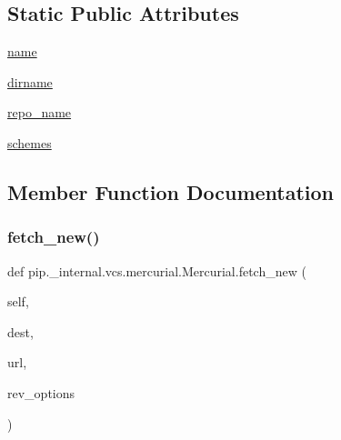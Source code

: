 \subsection*{Static Public Attributes}
\begin{DoxyCompactItemize}
\item 
\hyperlink{classpip_1_1__internal_1_1vcs_1_1mercurial_1_1Mercurial_ace7de8134914305d1206b35e1a99dc86}{name}
\item 
\hyperlink{classpip_1_1__internal_1_1vcs_1_1mercurial_1_1Mercurial_a1001ecd9ff559633d95e89dd4fe9453a}{dirname}
\item 
\hyperlink{classpip_1_1__internal_1_1vcs_1_1mercurial_1_1Mercurial_ab4679d727b3cc731db2797810e3afc35}{repo\+\_\+name}
\item 
\hyperlink{classpip_1_1__internal_1_1vcs_1_1mercurial_1_1Mercurial_a2f1bed2d44bdd78a5fb436e70aee81c4}{schemes}
\end{DoxyCompactItemize}


\subsection{Member Function Documentation}
\mbox{\label{classpip_1_1__internal_1_1vcs_1_1mercurial_1_1Mercurial_a7951bc33f0d4f7a510d41c5239c88cdf}} 
\subsubsection{\texorpdfstring{fetch\+\_\+new()}{fetch\_new()}}
{\footnotesize\ttfamily def pip.\+\_\+internal.\+vcs.\+mercurial.\+Mercurial.\+fetch\+\_\+new (\begin{DoxyParamCaption}\item[{}]{self,  }\item[{}]{dest,  }\item[{}]{url,  }\item[{}]{rev\+\_\+options }\end{DoxyParamCaption})}

\mbox{\label{classpip_1_1__internal_1_1vcs_1_1mercurial_1_1Mercurial_a3a6d55f32b6e778797fb25e31e0f6997}} 
